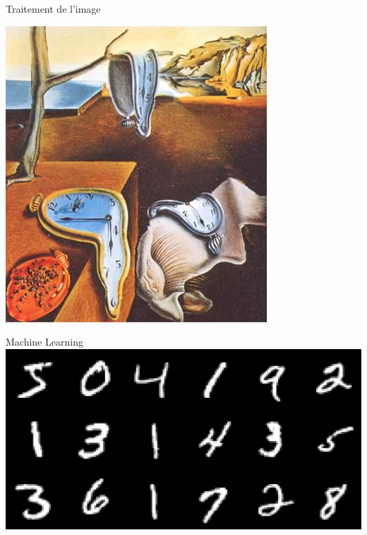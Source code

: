 \documentclass[aspectratio=169]{beamer}
\begin{document}
\begin{frame}[t, c]{Traitement de l'image}{}
\begin{overprint}
    \vfill
    \centering
    \includegraphics[height=.75\textheight]{cropped_img_0000}
    \vfill

  \end{overprint}
\end{frame}

\begin{frame}[t, c]{Machine Learning}{}
  \vfill
  \centering
  \includegraphics[width=\textwidth]{mnist_examples}
  \vfill
\end{frame}
\end{document}
